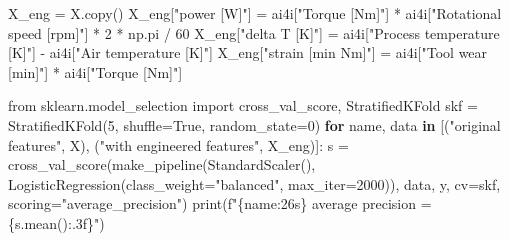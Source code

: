 \documentclass[
  letterpaper,
  DIV=11,
  numbers=noendperiod]{scrreprt}
\newenvironment{Shaded}{\begin{snugshade}}{\end{snugshade}}
\newcommand{\BuiltInTok}[1]{\textcolor[rgb]{0.00,0.23,0.31}{#1}}
\newcommand{\ControlFlowTok}[1]{\textcolor[rgb]{0.00,0.23,0.31}{\textbf{#1}}}
\newcommand{\DecValTok}[1]{\textcolor[rgb]{0.68,0.00,0.00}{#1}}
\newcommand{\ImportTok}[1]{\textcolor[rgb]{0.00,0.46,0.62}{#1}}
\newcommand{\KeywordTok}[1]{\textcolor[rgb]{0.00,0.23,0.31}{\textbf{#1}}}
\newcommand{\NormalTok}[1]{\textcolor[rgb]{0.00,0.23,0.31}{#1}}
\newcommand{\OperatorTok}[1]{\textcolor[rgb]{0.37,0.37,0.37}{#1}}
\newcommand{\SpecialCharTok}[1]{\textcolor[rgb]{0.37,0.37,0.37}{#1}}
\newcommand{\SpecialStringTok}[1]{\textcolor[rgb]{0.13,0.47,0.30}{#1}}
\newcommand{\StringTok}[1]{\textcolor[rgb]{0.13,0.47,0.30}{#1}}
\newcommand{\VariableTok}[1]{\textcolor[rgb]{0.07,0.07,0.07}{#1}}
\begin{document}
\begin{tcolorbox}[enhanced jigsaw, left=2mm, title=\textcolor{quarto-callout-caution-color}{\faFire}\hspace{0.5em}{Solution to Exercise 4}, opacityback=0, breakable, rightrule=.15mm, arc=.35mm, toptitle=1mm, colbacktitle=quarto-callout-caution-color!10!white, opacitybacktitle=0.6, coltitle=black, colframe=quarto-callout-caution-color-frame, bottomrule=.15mm, leftrule=.75mm, bottomtitle=1mm, titlerule=0mm, toprule=.15mm, colback=white]

\begin{Shaded}
\begin{Highlighting}[]
\NormalTok{X\_eng }\OperatorTok{=}\NormalTok{ X.copy()}
\NormalTok{X\_eng[}\StringTok{"power [W]"}\NormalTok{] }\OperatorTok{=}\NormalTok{ ai4i[}\StringTok{"Torque [Nm]"}\NormalTok{] }\OperatorTok{*}\NormalTok{ ai4i[}\StringTok{"Rotational speed [rpm]"}\NormalTok{] }\OperatorTok{*} \DecValTok{2} \OperatorTok{*}\NormalTok{ np.pi }\OperatorTok{/} \DecValTok{60}
\NormalTok{X\_eng[}\StringTok{"delta T [K]"}\NormalTok{] }\OperatorTok{=}\NormalTok{ ai4i[}\StringTok{"Process temperature [K]"}\NormalTok{] }\OperatorTok{{-}}\NormalTok{ ai4i[}\StringTok{"Air temperature [K]"}\NormalTok{]}
\NormalTok{X\_eng[}\StringTok{"strain [min Nm]"}\NormalTok{] }\OperatorTok{=}\NormalTok{ ai4i[}\StringTok{"Tool wear [min]"}\NormalTok{] }\OperatorTok{*}\NormalTok{ ai4i[}\StringTok{"Torque [Nm]"}\NormalTok{]}

\ImportTok{from}\NormalTok{ sklearn.model\_selection }\ImportTok{import}\NormalTok{ cross\_val\_score, StratifiedKFold}
\NormalTok{skf }\OperatorTok{=}\NormalTok{ StratifiedKFold(}\DecValTok{5}\NormalTok{, shuffle}\OperatorTok{=}\VariableTok{True}\NormalTok{, random\_state}\OperatorTok{=}\DecValTok{0}\NormalTok{)}
\ControlFlowTok{for}\NormalTok{ name, data }\KeywordTok{in}\NormalTok{ [(}\StringTok{"original features"}\NormalTok{, X), (}\StringTok{"with engineered features"}\NormalTok{, X\_eng)]:}
\NormalTok{    s }\OperatorTok{=}\NormalTok{ cross\_val\_score(make\_pipeline(StandardScaler(), LogisticRegression(class\_weight}\OperatorTok{=}\StringTok{"balanced"}\NormalTok{, max\_iter}\OperatorTok{=}\DecValTok{2000}\NormalTok{)),}
\NormalTok{                        data, y, cv}\OperatorTok{=}\NormalTok{skf, scoring}\OperatorTok{=}\StringTok{"average\_precision"}\NormalTok{)}
    \BuiltInTok{print}\NormalTok{(}\SpecialStringTok{f"}\SpecialCharTok{\{}\NormalTok{name}\SpecialCharTok{:26s\}}\SpecialStringTok{ average precision = }\SpecialCharTok{\{}\NormalTok{s}\SpecialCharTok{.}\NormalTok{mean()}\SpecialCharTok{:.3f\}}\SpecialStringTok{"}\NormalTok{)}
\end{Highlighting}
\end{Shaded}


\end{tcolorbox}
\end{document}

